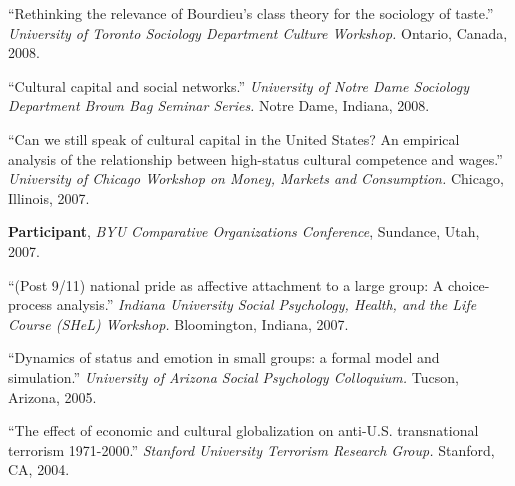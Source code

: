 \ind  ``Rethinking the relevance of Bourdieu's class theory for the sociology of taste.'' \emph{University of Toronto Sociology Department Culture Workshop.} Ontario, Canada, 2008.

\ind  ``Cultural capital and social networks.''  \emph{University of Notre Dame Sociology Department Brown Bag Seminar Series.} Notre Dame, Indiana, 2008.

\ind  ``Can we still speak of cultural capital in the United States? An empirical analysis of the relationship between high-status cultural competence and wages.'' \emph{University of Chicago Workshop on Money, Markets and Consumption.} Chicago, Illinois, 2007.

\ind \textbf{Participant}, \emph{BYU Comparative Organizations Conference}, Sundance, Utah, 2007.

\ind  ``(Post 9/11) national pride as affective attachment to a large group:  A choice-process analysis.''  \emph{Indiana University Social Psychology, Health, and the Life Course (SHeL) Workshop.} Bloomington, Indiana, 2007.

\ind ``Dynamics of status and emotion in small groups: a formal model and simulation.'' \emph{University of Arizona Social Psychology Colloquium.}  Tucson, Arizona, 2005.

\ind ``The effect of economic and cultural globalization on anti-U.S. transnational terrorism 1971-2000.'' \emph{Stanford University Terrorism Research Group.} Stanford, CA, 2004.
